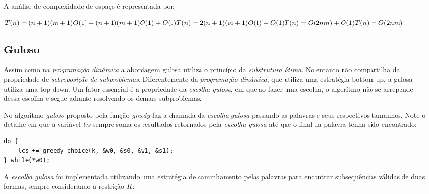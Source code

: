 
%        


A análise de complexidade de espaço é representada por:

\begin{math}
T(n) = (n+1)(m+1)O(1) + (n+1)(m+1)O(1) + O(1) \\
T(n) = 2(n+1)(m+1)O(1) + O(1) \\
T(n) = O(2nm) + O(1) \\
T(n) = O(2nm)
\end{math}

\subsection{Guloso}

Assim como na \emph{programação dinâmica} a abordagem gulosa utiliza
o princípio da \emph{substrutura ótima}. No entanto não compartilha 
da propriedade de \emph{sobreposição de subproblemas}. Diferentemente
da \emph{programação dinâmica}, que utiliza uma estratégia bottom-up, 
a gulosa utiliza uma top-down. Um fator essencial é a propriedade da
\emph{escolha gulosa}, em que ao fazer uma escolha, o algorítmo não 
se arrepende dessa escolha e segue adiante resolvendo os demais 
subproblemas.

No algorítmo \emph{guloso} proposto pela função {\it greedy} faz a chamada
da \emph{escolha gulosa} passando as palavras e seus respectivos tamanhos.
Note o detalhe em que a variável {\it lcs} sempre soma os resultados 
retornados pela \emph{encolha gulosa} até que o final da palavra tenha
sido encontrado:

\begin{lstlisting}
do {
    lcs += greedy_choice(k, &w0, &s0, &w1, &s1);
} while(*w0);
\end{lstlisting}

A \emph{escolha gulosa} foi implementada utilizando uma estratégia
de caminhamento pelas palavras para encontrar subsequências válidas
de duas formas, sempre considerando a restrição $K$:


